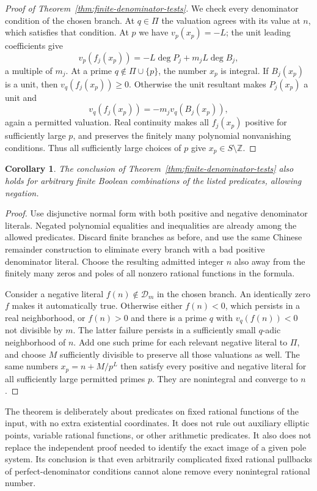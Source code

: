 \documentclass[11pt]{article}
\newtheorem{corollary}[theorem]{Corollary}
\theoremstyle{definition}
\begin{document}
\begin{proof}[Proof of Theorem~\ref{thm:finite-denominator-tests}]
We check every denominator condition of the chosen branch.  At
$q\in\Pi$ the valuation agrees with its value at $n$, which
satisfies that condition.  At $p$ we have $v_p(x_p)=-L$; the unit
leading coefficients give
\[
 v_p(f_j(x_p))=-L\deg P_j+m_jL\deg B_j,
\]
a multiple of $m_j$.  At a prime $q\notin\Pi\cup\{p\}$,
the number $x_p$ is integral.  If $B_j(x_p)$ is a unit, then
$v_q(f_j(x_p))\ge0$.  Otherwise the unit resultant makes
$P_j(x_p)$ a unit and
\[
                      v_q(f_j(x_p))=-m_jv_q(B_j(x_p)),
\]
again a permitted valuation.  Real continuity makes all $f_j(x_p)$
positive for sufficiently large $p$, and preserves the finitely
many polynomial nonvanishing conditions.  Thus all sufficiently
large choices of $p$ give $x_p\in S\setminus\mathbb Z$.
\end{proof}

\begin{corollary}\label{cor:boolean-denominator-tests}
The conclusion of Theorem~\ref{thm:finite-denominator-tests} also
holds for arbitrary finite Boolean combinations of the listed
predicates, allowing negation.
\end{corollary}
\begin{proof}
Use disjunctive normal form with both positive and negative denominator
literals.  Negated polynomial equalities and inequalities are already
among the allowed predicates.  Discard finite branches as before, and
use the same Chinese remainder construction to eliminate every branch
with a bad positive denominator literal.  Choose the resulting
admitted integer $n$ also away from the finitely many zeros and poles
of all nonzero rational functions in the formula.

Consider a negative literal $f(n)\notin\mathcal D_m$ in the chosen
branch.  An identically zero $f$ makes it automatically true.  Otherwise
either $f(n)<0$, which persists in a real neighborhood, or $f(n)>0$
and there is a prime $q$ with $v_q(f(n))<0$ not divisible by $m$.
The latter failure persists in a sufficiently small $q$-adic
neighborhood of $n$.  Add one such prime for each relevant negative
literal to $\Pi$, and choose $M$ sufficiently divisible to preserve
all those valuations as well.  The same numbers $x_p=n+M/p^L$
then satisfy every positive and negative literal for all sufficiently
large permitted primes $p$.  They are nonintegral and converge to $n$.
\end{proof}

The theorem is deliberately about predicates on fixed rational
functions of the input, with no extra existential coordinates.
It does not rule out auxiliary elliptic points, variable rational
functions, or other arithmetic predicates.  It also does not replace
the independent proof needed to identify the exact image of a given
pole system.  Its conclusion is that even arbitrarily complicated
fixed rational pullbacks of perfect-denominator conditions cannot
alone remove every nonintegral rational number.
\end{document}
